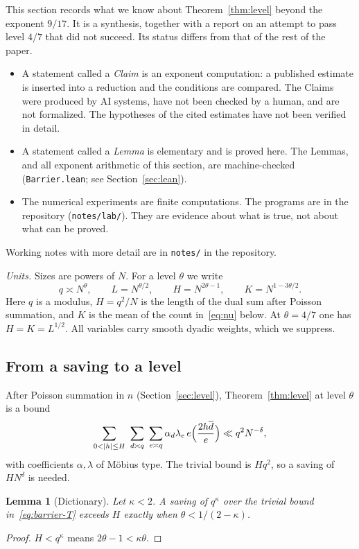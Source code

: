 \documentclass[11pt]{amsart}
\newtheorem{lemma}[theorem]{Lemma}
\theoremstyle{definition}
\theoremstyle{remark}
\numberwithin{equation}{section}
\newcommand{\inv}[1]{\overline{#1}}
\begin{document}
This section records what we know about Theorem~\ref{thm:level} beyond the
exponent $9/17$.  It is a synthesis, together with a report on an attempt to
pass level $4/7$ that did not succeed.  Its status differs from that of the
rest of the paper.
\begin{itemize}
\item A statement called a \emph{Claim} is an exponent computation: a
published estimate is inserted into a reduction and the conditions are
compared.  The Claims were produced by AI systems, have not been checked by
a human, and are not formalized.  The hypotheses of the cited estimates have
not been verified in detail.
\item A statement called a \emph{Lemma} is elementary and is proved here.
The Lemmas, and all exponent arithmetic of this section, are machine-checked
(\texttt{Barrier.lean}; see Section~\ref{sec:lean}).
\item The numerical experiments are finite computations.  The programs are
in the repository (\texttt{notes/lab/}).  They are evidence about what is
true, not about what can be proved.
\end{itemize}
Working notes with more detail are in \texttt{notes/} in the repository.

\emph{Units.}  Sizes are powers of $N$.  For a level $\theta$ we write
\[
 q\asymp N^{\theta},\qquad L=N^{\theta/2},\qquad H=N^{2\theta-1},\qquad
 K=N^{1-3\theta/2}.
\]
Here $q$ is a modulus, $H=q^2/N$ is the length of the dual sum after Poisson
summation, and $K$ is the mean of the count in~\eqref{eq:nu} below.  At
$\theta=4/7$ one has $H=K=L^{1/2}$.  All variables carry smooth dyadic
weights, which we suppress.

\subsection{From a saving to a level}\label{sec:dictionary}
After Poisson summation in $n$ (Section~\ref{sec:level}),
Theorem~\ref{thm:level} at level $\theta$ is a bound
\begin{equation}\label{eq:barrier-T}
 \sum_{0<|h|\le H}\ \sum_{d\asymp q}\ \sum_{e\asymp q}\alpha_d\lambda_e\,
 e\Bigl(\frac{2h\inv d}{e}\Bigr)\ll q^{2}N^{-\delta},
\end{equation}
with coefficients $\alpha,\lambda$ of M\"obius type.  The trivial bound is
$Hq^2$, so a saving of $HN^{\delta}$ is needed.

\begin{lemma}[Dictionary]\label{lem:dictionary}
Let $\kappa<2$.  A saving of $q^{\kappa}$ over the trivial bound
in~\eqref{eq:barrier-T} exceeds $H$ exactly when $\theta<1/(2-\kappa)$.
\end{lemma}
\begin{proof}
$H<q^{\kappa}$ means $2\theta-1<\kappa\theta$.
\end{proof}
\end{document}
